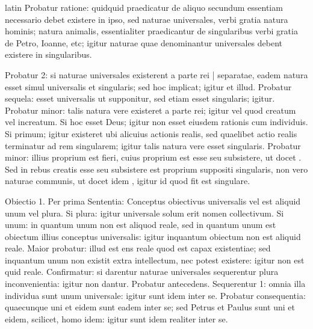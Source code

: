 \begin{otherlanguage*}{latin}
\pstart
Probatur ratione:
quidquid praedicatur de aliquo secundum essentiam necessario debet existere in ipso, sed naturae universales, verbi gratia natura hominis; natura animalis, essentialiter praedicantur de singularibus verbi gratia de Petro, Ioanne, etc; igitur naturae quae denominantur universales debent existere in singularibus. 
\pend

\pstart
Probatur 2:
si naturae universales existerent a parte rei \textnormal{|} separatae, eadem natura esset simul universalis et singularis; sed hoc implicat; igitur et illud. Probatur sequela:
esset universalis ut supponitur, sed etiam esset singularis; igitur. Probatur minor:
talis natura vere existeret a parte rei; igitur vel quod creatum vel increatum. Si hoc esset Deus; igitur non esset eiusdem rationis cum individuis. Si primum; igitur existeret ubi alicuius actionis realis, sed quaelibet actio realis terminatur ad rem singularem; igitur talis natura vere esset singularis. Probatur minor:
illius proprium est fieri, cuius proprium est esse seu subsistere, ut docet . Sed in rebus creatis esse seu subsistere est proprium suppositi singularis, non vero naturae communis, ut docet idem , igitur id quod fit est singulare. 
\pend

\pstart
Obiectio 1. Per prima Sententia:
Conceptus obiectivus universalis vel est aliquid unum vel plura. Si plura:
igitur universale solum erit nomen collectivum. Si unum:
in quantum unum non est aliquod reale, sed in quantum unum est obiectum illius conceptus universalis:
igitur inquantum obiectum non est aliquid reale. Maior probatur:
illud est ens reale quod est capax existentiae; sed inquantum unum non existit extra intellectum, nec potest existere:
igitur non est quid reale. Confirmatur:
si darentur naturae universales sequerentur plura inconvenientia:
igitur non dantur. Probatur antecedens. Sequerentur 1:
omnia illa individua sunt unum universale:
igitur sunt idem inter se. Probatur consequentia:
quaecunque uni et eidem sunt eadem inter se; sed Petrus et Paulus sunt uni et eidem, scilicet, homo idem:
igitur sunt idem realiter inter se. 
\pend


\end{otherlanguage*}
